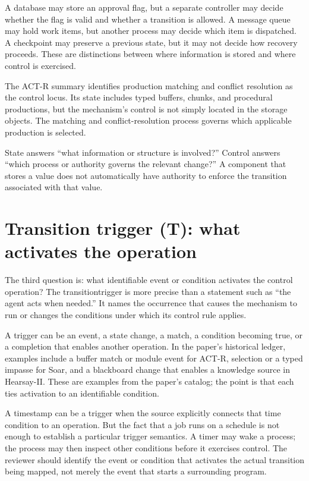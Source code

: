 A database may store an approval flag, but a separate controller may decide whether the flag is valid and whether a transition is allowed. A message queue may hold work items, but another process may decide which item is dispatched. A checkpoint may preserve a previous state, but it may not decide how recovery proceeds. These are \BookExampleLabel{} distinctions between where information is stored and where control is exercised.

The ACT-R summary identifies production matching and conflict resolution as the control locus. Its state includes typed buffers, chunks, and procedural productions, but the mechanism's control is not simply located in the storage objects. The matching and conflict-resolution process governs which applicable production is selected.

\begin{takeawaybox}
State answers ``what information or structure is involved?'' Control answers ``which process or authority governs the relevant change?'' A component that stores a value does not automatically have authority to enforce the transition associated with that value.
\end{takeawaybox}

\section{Transition trigger (T): what activates the operation}
\label{sec:field-trigger}

The third question is: what identifiable event or condition activates the control operation? The \gls{transitiontrigger} is more precise than a statement such as ``the agent acts when needed.'' It names the occurrence that causes the mechanism to run or changes the conditions under which its control rule applies.

A trigger can be an event, a state change, a match, a condition becoming true, or a completion that enables another operation. In the paper's historical ledger, examples include a buffer match or module event for ACT-R, selection or a typed impasse for Soar, and a blackboard change that enables a knowledge source in Hearsay-II. These are examples from the paper's catalog; the point is that each ties activation to an identifiable condition.

A timestamp can be a trigger when the source explicitly connects that time condition to an operation. But the fact that a job runs on a schedule is not enough to establish a particular trigger semantics. A timer may wake a process; the process may then inspect other conditions before it exercises control. The reviewer should identify the event or condition that activates the actual transition being mapped, not merely the event that starts a surrounding program.

